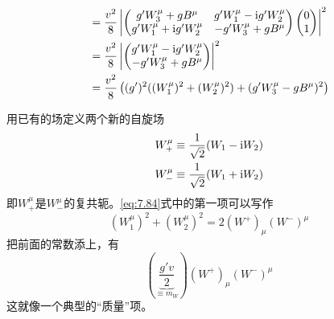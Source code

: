 \begin{equation}
\begin{aligned}
& = \frac{v^2}{8} \left|\begin{pmatrix}
g'W_3^\mu+gB^\mu & g'W_1^\mu-\mathrm i g'W_2^\mu \\ g'W_1^\mu+\mathrm i g'W_2^\mu & -g'W_3^\mu+gB^\mu
\end{pmatrix}\begin{pmatrix} 0 \\ 1 \end{pmatrix}\right|^2 \\
& = \frac{v^2}{8} \left|\begin{pmatrix}
g'W_1^\mu-\mathrm i g'W_2^\mu \\  -g'W_3^\mu+gB^\mu
\end{pmatrix}\right|^2 \\
& = \frac{v^2}{8} \left((g')^2((W_1^\mu)^2+ (W_2^\mu)^2) +  (g'W_3^\mu-gB^\mu)^2\right)
\end{aligned}
\label{eq:7.84}
\end{equation}

用已有的场定义两个新的自旋场
\begin{eqnarray}
W_+^\mu &\equiv \frac{1}{\sqrt{2}}(W_1-\mathrm i W_2) \\
W_-^\mu &\equiv \frac{1}{\sqrt{2}}(W_1+\mathrm i W_2)
\end{eqnarray}
即$W_+^\mu$是$W_-^\mu$的复共轭。\ref{eq:7.84}式中的第一项可以写作
\begin{equation}
(W_1^\mu)^2+ (W_2^\mu)^2 = 2 (W^+)_\mu(W^-)^\mu
\end{equation}
把前面的常数添上，有
\begin{equation}
\left(\underbrace{\frac{g'v}{2}}_{\equiv m_W}\right)(W^+)_\mu(W^-)^\mu
\end{equation}
这就像一个典型的“质量”项。

